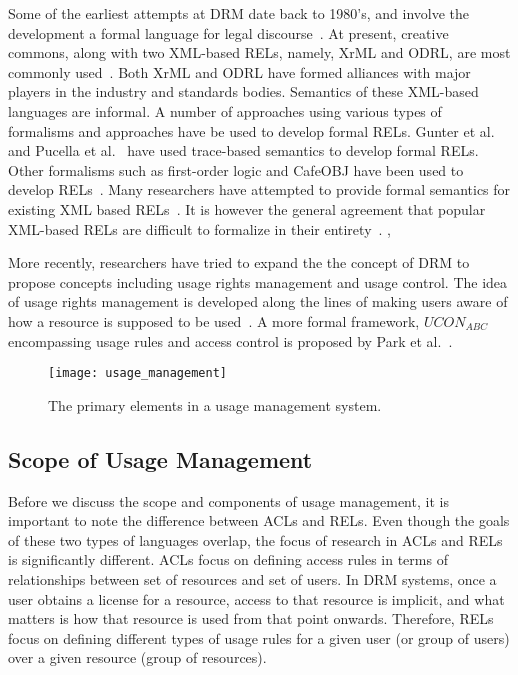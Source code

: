 Some of the earliest attempts at DRM date back to 1980's, and involve the development a formal language for legal discourse~\cite{Bo:88,McG:88,McC:89}. At present, creative commons, along with two XML-based RELs, namely, XrML and ODRL, are most commonly used~\cite{XrML:02,Ia:00}. Both XrML and ODRL have formed alliances with major players in the industry and standards bodies.  Semantics of these XML-based languages are informal. A number of approaches using various types of formalisms and approaches have be used to develop formal RELs. Gunter et al.~\cite{GuWeWr:01} and Pucella et al.~\cite{PuWe:02} have used trace-based semantics to develop formal RELs. Other formalisms such as first-order logic and CafeOBJ have been used to develop RELs~\cite{ArHu:07,ChCoEtHaJoLa:03,XiBjFu:08}. Many researchers have attempted to provide formal semantics for existing XML based RELs~\cite{HaWe:04,PuWe:06,HaWe:08}. It is however the general agreement that popular XML-based RELs are difficult to formalize in their entirety~\cite{HaWe:04,HaWe:08,JaHeMa:06}. ,

More recently, researchers have tried to expand the the concept of DRM to propose concepts including usage rights management and usage control. The idea of usage rights management is developed along the lines of making users aware of how a resource is supposed to be used~\cite{HuPaGr:09}. A more formal framework, $UCON_{ABC}$ encompassing usage rules and access control is proposed by Park et al.~\cite{PaSa:04}.

\begin{figure}[t]
 \centerline{\texttt{[image: usage\_management]}}
 \caption{The primary elements in a usage management system.} \label{UM}
\end{figure}


\subsection{Scope of Usage Management}
Before we discuss the scope and components of usage management, it is important to note the difference between ACLs and RELs. Even though the goals of these two types of languages overlap, the focus of research in ACLs and RELs is significantly different.  ACLs focus on defining access rules in terms of relationships between set of resources and set of users. In DRM systems, once a user obtains a license for a resource, access to that resource is implicit, and what matters is how that resource is used from that point onwards. Therefore, RELs  focus on defining different types of usage rules for a given user (or group of users) over a given resource (group of resources). 

